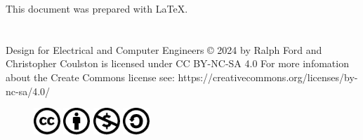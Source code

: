 This document was prepared with \LaTeX.
\\
\\
\\

Design for Electrical and Computer Engineers © 2024 by Ralph Ford and Christopher Coulston is licensed under CC BY-NC-SA 4.0 
For more infomation about the Create Commons license see: https://creativecommons.org/licenses/by-nc-sa/4.0/

\begin{figure}[h]
\includegraphics[width=1cm]{./Fig/cc-logo.pdf}
\includegraphics[width=1cm]{./Fig/cc-by.pdf}
\includegraphics[width=1cm]{./Fig/cc-nc.pdf}
\includegraphics[width=1cm]{./Fig/cc-sa.pdf}
\end{figure}